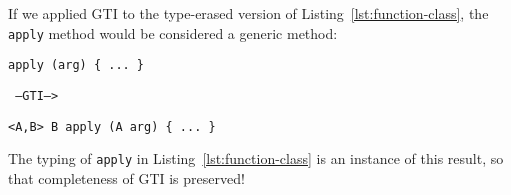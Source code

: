 If we applied GTI to the type-erased version of
Listing~\ref{lst:function-class}, the \texttt{apply} method would be considered a generic method: 
\begin{center}
  \begin{minipage}{0.3\linewidth}
\begin{lstlisting}[style=tfgj]
apply (arg) { ... }
\end{lstlisting}
  \end{minipage}
  \hfill\texttt{ --GTI--> }\hfill
  \begin{minipage}{0.45\linewidth}
\begin{lstlisting}[style=fgj]
<A,B> B apply (A arg) { ... }
\end{lstlisting}
  \end{minipage}
\end{center}
The typing of \texttt{apply} in Listing~\ref{lst:function-class} is an
instance of this result, so that completeness of GTI is preserved!


